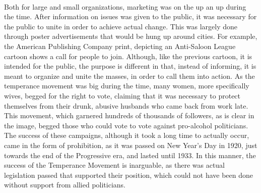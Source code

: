\documentclass[12pt]{article}
\begin{document}
\paragraph{} Both for large and small organizations, marketing was on the up an up during the time. After information on issues was given to the public, it was necessary for the public to unite in order to achieve actual change. This was largely done through poster advertisements that would be hung up around cities. For example, the American Publishing Company print, depicting an Anti-Saloon League cartoon shows a call for people to join. Although, like the previous cartoon, it is intended for the public, the purpose is different in that, instead of informing, it is meant to organize and unite the masses, in order to call them into action. As the temperance movement was big during the time, many women, more specifically wives, begged for the right to vote, claiming that it was necessary to protect themselves from their drunk, abusive husbands who came back from work late. This movement, which garnered hundreds of thousands of followers, as is clear in the image, begged those who could vote to vote against pro-alcohol politicians. The success of these campaigns, although it took a long time to actually occur, came in the form of prohibition, as it was passed on New Year's Day in 1920, just towards the end of the Progressive era, and lasted until 1933. In this manner, the success of the Temperance Movement is inarguable, as there was actual legislation passed that supported their position, which could not have been done without support from allied politicians.
\end{document}
